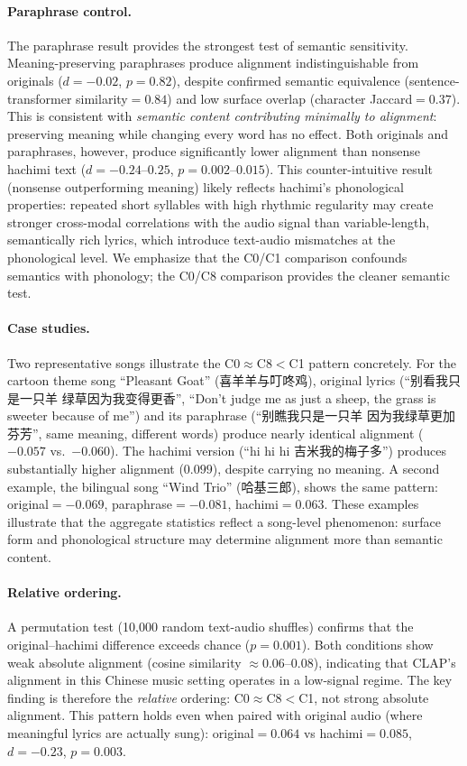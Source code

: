 \documentclass[11pt]{article}
\begin{document}
\paragraph{Paraphrase control.}
The paraphrase result provides the strongest test of semantic sensitivity. Meaning-preserving paraphrases produce alignment indistinguishable from originals ($d{=}{-}0.02$, $p{=}0.82$), despite confirmed semantic equivalence (sentence-transformer similarity${=}0.84$) and low surface overlap (character Jaccard${=}0.37$). This is consistent with \emph{semantic content contributing minimally to alignment}: preserving meaning while changing every word has no effect. Both originals and paraphrases, however, produce significantly lower alignment than nonsense hachimi text ($d{=}{-}0.24$--$0.25$, $p{=}0.002$--$0.015$). This counter-intuitive result (nonsense outperforming meaning) likely reflects hachimi's phonological properties: repeated short syllables with high rhythmic regularity may create stronger cross-modal correlations with the audio signal than variable-length, semantically rich lyrics, which introduce text-audio mismatches at the phonological level. We emphasize that the C0/C1 comparison confounds semantics with phonology; the C0/C8 comparison provides the cleaner semantic test.

\paragraph{Case studies.}
Two representative songs illustrate the C0${\approx}$C8${<}$C1 pattern concretely. For the cartoon theme song ``Pleasant Goat'' (\textrm{喜羊羊与叮咚鸡}), original lyrics (``\textrm{别看我只是一只羊 绿草因为我变得更香}'', ``Don't judge me as just a sheep, the grass is sweeter because of me'') and its paraphrase (``\textrm{别瞧我只是一只羊 因为我绿草更加芬芳}'', same meaning, different words) produce nearly identical alignment (${-}0.057$ vs.\ ${-}0.060$). The hachimi version (``\textrm{hi hi hi 吉米我的梅子多}'') produces substantially higher alignment ($0.099$), despite carrying no meaning. A second example, the bilingual song ``Wind Trio'' (\textrm{哈基三郎}), shows the same pattern: original${=}{-}0.069$, paraphrase${=}{-}0.081$, hachimi${=}0.063$. These examples illustrate that the aggregate statistics reflect a song-level phenomenon: surface form and phonological structure may determine alignment more than semantic content.

\paragraph{Relative ordering.}
A permutation test (10{,}000 random text-audio shuffles) confirms that the original--hachimi difference exceeds chance ($p{=}0.001$). Both conditions show weak absolute alignment (cosine similarity ${\approx}0.06$--$0.08$), indicating that CLAP's alignment in this Chinese music setting operates in a low-signal regime. The key finding is therefore the \emph{relative} ordering: C0${\approx}$C8${<}$C1, not strong absolute alignment. This pattern holds even when paired with original audio (where meaningful lyrics are actually sung): original${=}0.064$ vs hachimi${=}0.085$, $d{=}{-}0.23$, $p{=}0.003$.
\end{document}
